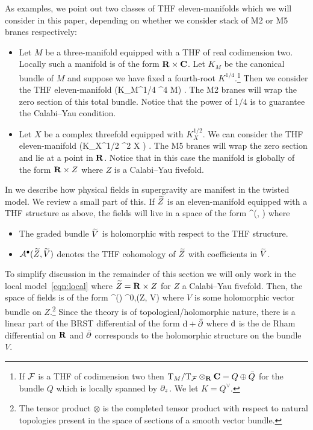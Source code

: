 \documentclass[../main.tex]{subfiles}
\begin{document}
As examples, we point out two classes of THF eleven-manifolds which we will consider in this paper, depending on whether we consider stack of M2 or M5 branes respectively:
\begin{itemize}
\item Let $M$ be a three-manifold equipped with a THF of real codimension two. 
Locally such a manifold is of the form $\mathbf{R} \times \mathbf{C}$.
Let $K_M$ be the canonical bundle of $M$ and suppose we have fixed a fourth-root $K^{1/4}$.\footnote{If $\mathcal F$ is a THF of codimension two then ${\mathrm{T}}_M / {\mathrm{T}}_\mathcal F \otimes_{\mathbf{R}} \mathbf{C} = Q \oplus \bar{Q}$ for the bundle $Q$ which is locally spanned by $\partial_z$.
We let $K = Q^\vee$.}
Then we consider the THF eleven-manifold 
\beqn\label{eqn:thfm2}
 \left(K_M^{1/4} \otimes \C^4 \to M\right) .
\eeqn
The M2 branes will wrap the zero section of this total bundle.
Notice that the power of $1/4$ is to guarantee the Calabi--Yau condition.
\item Let $X$ be a complex threefold equipped with $K_X^{1/2}$.
We can consider the THF eleven-manifold
\beqn\label{eqn:thfm5}
\R \times {} \left(K_X^{1/2} \otimes \C^2 \to X \right) .
\eeqn
The M5 branes will wrap the zero section and lie at a point in $\mathbf{R}$.
Notice that in this case the manifold is globally of the form $\mathbf{R} \times Z$ where $Z$ is a Calabi--Yau fivefold.
\end{itemize}


In \cite{RSW,RWindex} we describe how physical fields in supergravity are manifest in the twisted model.
We review a small part of this.
If $\widetilde{Z}$ is an eleven-manifold equipped with a THF structure as above, the fields will live in a space of the form
\beqn
\cA^\bu(, )
\eeqn
where
\begin{itemize}
\item The graded bundle $\widetilde{V}$ is holomorphic with respect to the THF structure.
\item $\mathcal A^\bullet (\widetilde{Z}, \widetilde{V})$ denotes the THF cohomology of $\widetilde{Z}$ with coefficients in $\widetilde{V}$. 
\end{itemize}
To simplify discussion in the remainder of this section we will only work in the local model~\eqref{eqn:local} where $\widetilde{Z} = \mathbf{R} \times Z$ for $Z$ a Calabi--Yau fivefold.
Then, the space of fields is of the form
\beqn
\Omega^\bu(\R) \otimes \Omega^{0,\bu}(Z, V)
\eeqn
where $V$ is some holomorphic vector bundle on $Z$.\footnote{The tensor product $\otimes$ is the completed tensor product with respect to natural topologies present in the space of sections of a smooth vector bundle.}
Since the theory is of topological/holomorphic nature, there is a linear part of the BRST differential of the form $\mathrm{d} + \bar{\partial}$ where $\mathrm{d}$ is the de Rham differential on $\mathbf{R}$ and $\bar{\partial}$ corresponds to the holomorphic structure on the bundle $V$.
\end{document}
